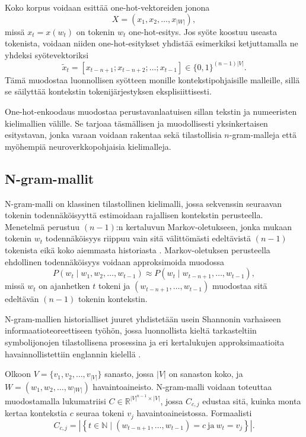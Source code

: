 Koko korpus voidaan esittää one-hot-vektoreiden jonona
\[
  X = (x_1, x_2, \dots, x_{|W|}),
\]
missä \(x_t = x(w_t)\) on tokenin \(w_t\) one-hot-esitys. Jos syöte koostuu
useasta tokenista, voidaan niiden one-hot-esitykset yhdistää esimerkiksi
ketjuttamalla ne yhdeksi syötevektoriksi
\[
  \tilde{x}_t = [x_{t-n+1}; x_{t-n+2}; \dots; x_{t-1}]
  \in \{0,1\}^{(n-1)|V|}.
\]
Tämä muodostaa luonnollisen syötteen monille kontekstipohjaisille malleille,
sillä se säilyttää kontekstin tokenijärjestyksen eksplisiittisesti.

One-hot-enkoodaus muodostaa perustavanlaatuisen sillan tekstin
ja numeeristen kielimallien välille. Se tarjoaa täsmällisen ja muodollisesti
yksinkertaisen esitystavan, jonka varaan voidaan rakentaa sekä tilastollisia
\(n\)-gram-malleja että myöhempiä neuroverkkopohjaisia kielimalleja.

\subsection{N-gram-mallit}\label{sec:n-gram}

N-gram-malli on klassinen tilastollinen kielimalli, jossa sekvenssin seuraavan
tokenin todennäköisyyttä estimoidaan rajallisen kontekstin perusteella.
Menetelmä perustuu \((n-1)\):n kertaluvun Markov-oletukseen, jonka mukaan
tokenin \(w_t\) todennäköisyys riippuu vain sitä välittömästi edeltävistä
\((n-1)\) tokenista eikä koko aiemmasta historiasta
. Markov-oletuksen perusteella
ehdollinen todennäköisyys voidaan approksimoida muodossa
\[
  P(w_t \mid w_1, w_2, \ldots, w_{t-1})
  \approx
  P(w_t \mid w_{t-n+1}, \ldots, w_{t-1}),
\]
missä \(w_t\) on ajanhetken \(t\) tokeni ja
\((w_{t-n+1}, \ldots, w_{t-1})\) muodostaa sitä edeltävän
\((n-1)\) tokenin kontekstin.

N-gram-mallien historialliset juuret yhdistetään usein Shannonin varhaiseen
informaatioteoreettiseen työhön, jossa luonnollista kieltä tarkasteltiin
symbolijonojen tilastollisena prosessina ja eri kertalukujen approksimaatioita
havainnollistettiin englannin kielellä
\cite{shannon1948mathematical,shannon1951prediction}.

Olkoon \(V = \{v_1, v_2, \ldots, v_{|V|}\}\) sanasto, jossa \(|V|\) on sanaston
koko, ja \(W = (w_1, w_2, \ldots, w_{|W|})\) havaintoaineisto. N-gram-malli
voidaan toteuttaa muodostamalla lukumatriisi
\(C \in \mathbb{R}^{|V|^{n-1} \times |V|}\), jossa \(C_{c,j}\) edustaa sitä,
kuinka monta kertaa kontekstia \(c\) seuraa tokeni \(v_j\)
havaintoaineistossa. Formaalisti
\[
  C_{c,j}
  =
  \left|
  \left\{
    t \in \mathbb{N}
    \mid
    (w_{t-n+1}, \ldots, w_{t-1}) = c
    \ \text{ja}\
    w_t = v_j
  \right\}
  \right|.
\]

